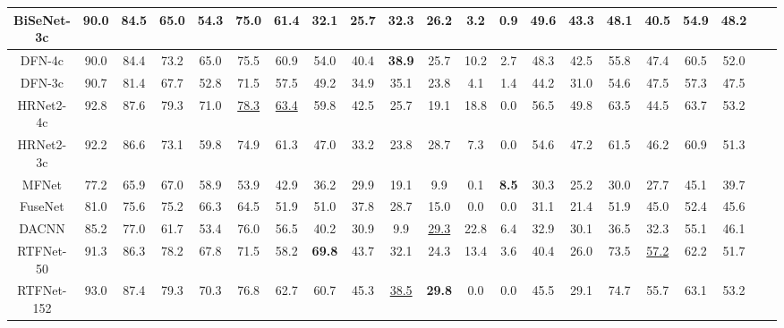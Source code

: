 \documentclass[10pt,twocolumn,letterpaper]{article}
\begin{document}
\begin{table*}[htbp]
\begin{tabular}{cccccccccccccccccccccccc}
\multicolumn{4}{c}{BiSeNet-3c \cite{DBLP:journals/corr/abs-1808-00897}} & 90.0  & 84.5  & 65.0  & 54.3  & 75.0  & 61.4  & 32.1  & 25.7  & 32.3  & 26.2  & 3.2   & 0.9   & 49.6  & 43.3  & 48.1  & 40.5  & 54.9  & 48.2  \\
    \midrule
    \multicolumn{4}{c}{DFN-4c \cite{DBLP:journals/corr/abs-1804-09337}}   & 90.0  & 84.4  & 73.2  & 65.0  & 75.5  & 60.9  & 54.0  & 40.4  & \textbf{38.9}  & 25.7  & 10.2  & 2.7   & 48.3  & 42.5  & 55.8  & 47.4  & 60.5  & 52.0  \\
\multicolumn{4}{c}{DFN-3c \cite{DBLP:journals/corr/abs-1804-09337}}   & 90.7  & 81.4  & 67.7  & 52.8  & 71.5  & 57.5  & 49.2  & 34.9  & 35.1  & 23.8  & 4.1   & 1.4   & 44.2  & 31.0  & 54.6  & 47.5  & 57.3  & 47.5  \\
    \midrule
    \multicolumn{4}{c}{HRNet2-4c \cite{DBLP:journals/corr/abs-1904-04514}} & 92.8  & 87.6  & 79.3  & 71.0  & \underline{78.3}  & \underline{63.4}  & 59.8  & 42.5  & 25.7  & 19.1  & 18.8  & 0.0   & 56.5  & 49.8  & 63.5  & 44.5  & 63.7  & 53.2  \\
\multicolumn{4}{c}{HRNet2-3c \cite{DBLP:journals/corr/abs-1904-04514}} & 92.2  & 86.6  & 73.1  & 59.8  & 74.9  & 61.3  & 47.0  & 33.2  & 23.8  & 28.7  & 7.3   & 0.0   & 54.6  & 47.2  & 61.5  & 46.2  & 60.9  & 51.3  \\
    \midrule
    \multicolumn{4}{c}{MFNet \cite{Ha2017}}     & 77.2  & 65.9  & 67.0  & 58.9  & 53.9  & 42.9  & 36.2  & 29.9  & 19.1  & 9.9   & 0.1   & \textbf{8.5}   & 30.3  & 25.2  & 30.0  & 27.7  & 45.1  & 39.7  \\
    \midrule
    \multicolumn{4}{c}{FuseNet \cite{DBLP:conf/accv/HazirbasMDC16}}   & 81.0  & 75.6  & 75.2  & 66.3  & 64.5  & 51.9  & 51.0  & 37.8  & 28.7  & 15.0  & 0.0   & 0.0   & 31.1  & 21.4  & 51.9  & 45.0  & 52.4  & 45.6  \\
    \midrule
    \multicolumn{4}{c}{DACNN \cite{DBLP:journals/corr/abs-1803-06791}} & 85.2  & 77.0  & 61.7  & 53.4  & 76.0  & 56.5  & 40.2  & 30.9  & 9.9   & \underline{29.3}  & 22.8  & 6.4  & 32.9  & 30.1  & 36.5  & 32.3  & 55.1  & 46.1  \\
    \midrule
    \multicolumn{4}{c}{RTFNet-50 \cite{Sun2019}} & 91.3  & 86.3  & 78.2  & 67.8  & 71.5  & 58.2  & \textbf{69.8}  & 43.7  & 32.1  & 24.3  & 13.4  & 3.6   & 40.4  & 26.0  & 73.5  & \underline{57.2}  & 62.2  & 51.7  \\
    \midrule
    \multicolumn{4}{c}{RTFNet-152 \cite{Sun2019}} & 93.0  & 87.4  & 79.3  & 70.3  & 76.8  & 62.7  & 60.7  & 45.3  & \underline{38.5}  & \textbf{29.8} & 0.0   & 0.0   & 45.5  & 29.1  & 74.7  & 55.7  & 63.1  & 53.2  \\

\end{tabular}
\end{table*}
\end{document}
